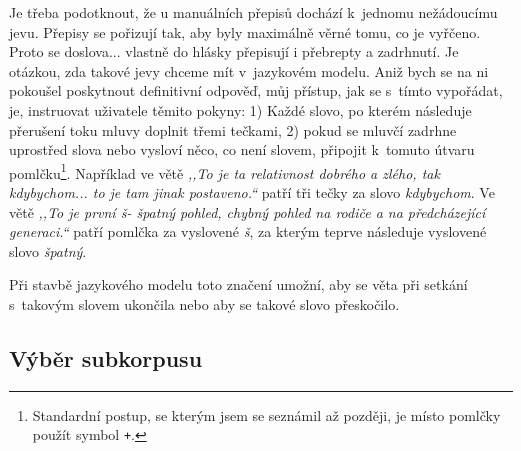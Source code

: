 Je třeba podotknout, že u manuálních přepisů dochází k~jednomu
nežádoucímu jevu. Přepisy se pořizují tak, aby byly maximálně věrné tomu, co je
vyřčeno. Proto se doslova... vlastně do hlásky přepisují i přebrepty a zadrhnutí.
Je otázkou, zda takové jevy chceme mít v~jazykovém modelu. Aniž bych se na ni
pokoušel poskytnout definitivní odpověď, můj přístup, jak se s~tímto vypořádat,
je, instruovat uživatele těmito pokyny: 1) Každé slovo, po kterém následuje přerušení toku
mluvy doplnit třemi tečkami,
2) pokud se mluvčí zadrhne uprostřed slova nebo vysloví něco, co není slovem,
připojit k~tomuto útvaru pomlčku\footnote{Standardní postup, se kterým jsem se
seznámil až později, je místo pomlčky použít symbol \texttt{+}.}. Například ve větě {\em ,,To je ta relativnost
dobrého a zlého, tak kdybychom... to je tam jinak postaveno.``} patří tři tečky
za slovo {\em kdybychom}. Ve větě {\em ,,To je první š- špatný pohled, chybný pohled na rodiče a na
předcházející generaci.``} patří pomlčka za vyslovené {\em š}, za kterým
teprve následuje vyslovené slovo {\em špatný}.

Při stavbě jazykového modelu toto značení umožní, aby se věta při setkání
s~takovým slovem ukončila nebo aby se takové slovo přeskočilo.

\subsection{Výběr subkorpusu}

